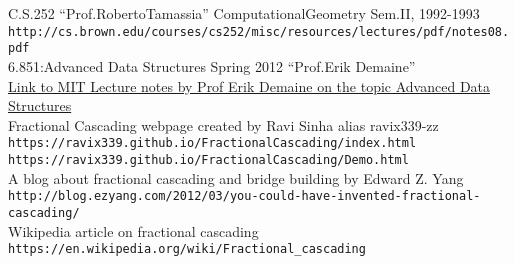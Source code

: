 \documentclass[11pt]{article}
\begin{document}

\pagebreak 
\begin{thebibliography}{}

C.S.252 ``Prof.RobertoTamassia'' ComputationalGeometry Sem.II, 1992-1993
\\
\texttt{http://cs.brown.edu/courses/cs252/misc/resources/lectures/pdf/notes08.pdf} \\


6.851:Advanced Data Structures Spring 2012 ``Prof.Erik Demaine'' \\
\href{https://ocw.mit.edu/courses/electrical-engineering-and-computer-science/6-851-advanced-data-structures-spring-2012/calendar-and-notes/MIT6_851S12_L3.pdf}{Link to MIT Lecture notes by Prof Erik Demaine on the topic Advanced Data Structures} \\


Fractional Cascading webpage created by Ravi Sinha alias ravix339-zz \\
\texttt{https://ravix339.github.io/FractionalCascading/index.html} \\
\texttt{https://ravix339.github.io/FractionalCascading/Demo.html} \\

A blog about fractional cascading and bridge building by Edward Z. Yang \\
\texttt{http://blog.ezyang.com/2012/03/you-could-have-invented-fractional-cascading/} \\

Wikipedia article on fractional cascading \\
\texttt{https://en.wikipedia.org/wiki/Fractional\_cascading}
\end{thebibliography}
\end{document}
